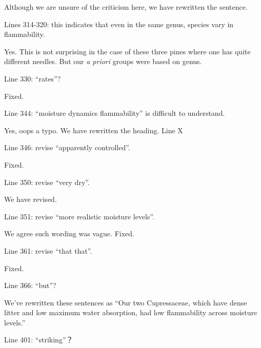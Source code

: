\documentclass[letterpaper, 12pt]{letter}
\begin{document}
\begin{letter}{}
Although we are unsure of the criticism here, we have rewritten the sentence.

\begin{quoting}
  Lines 314-320: this indicates that even in the same genus, species vary in
  flammability.
\end{quoting}

Yes. This is not surprising in the case of these three pines where one has
quite different needles. But our \emph{a priori} groups were based on genus.

\begin{quoting}
Line 330: “rates”?
\end{quoting}

Fixed.

\begin{quoting}
  Line 344: “moisture dynamics flammability” is difficult to understand.
\end{quoting}

Yes, oops a typo. We have rewritten the heading. Line X

\begin{quoting}
  Line 346: revise “apparently controlled”.
\end{quoting}

Fixed.

\begin{quoting}
  Line 350: revise “very dry”.
\end{quoting}

We have revised.

\begin{quoting}
Line 351: revise “more realistic moisture levels”.
\end{quoting}

We agree such wording was vague. Fixed.

\begin{quoting}
  Line 361: revise “that that”.
\end{quoting}

Fixed.

\begin{quoting}
  Line 366: “but”?
\end{quoting}

We've rewritten these sentences as ``Our two Cupressaceae, which have dense
litter and low maximum water absorption, had low flammability across moisture
levels.''

\begin{quoting}
  Line 401: “striking”？
\end{quoting}


\end{letter}
\end{document}
